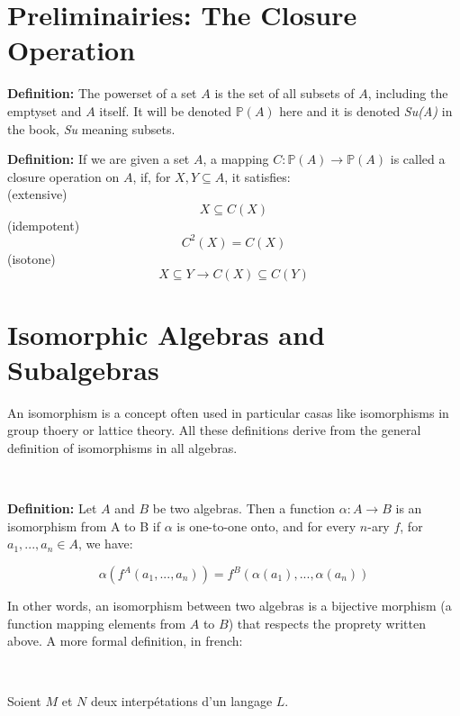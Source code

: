 \documentclass[a4paper, 11pt]{article}
\begin{document}
\section{Preliminairies: The Closure Operation}

\begin{tcolorbox} 
	\textbf{Definition:} The powerset of a set $A$ is the set of all subsets of $A$, including the emptyset and $A$ itself. It will be denoted $\mathbb{P}(A)$ here and it is denoted \textit{Su(A)} in the book, \textit{Su} meaning subsets.

\end{tcolorbox}

\begin{tcolorbox} 
	\textbf{Definition:} If we are given a set $A$, a mapping $C: \mathbb{P}(A) \rightarrow \mathbb{P}(A)$ is called a closure operation on $A$, if, for $X,Y \subseteq A$, it satisfies: \\
	(extensive)$$ X \subseteq C(X)$$
	(idempotent) $$ C^2(X) = C(X)$$
	(isotone) $$X \subseteq Y \rightarrow C(X) \subseteq C(Y)$$ 

\end{tcolorbox}

\section{Isomorphic Algebras and Subalgebras}

An isomorphism is a concept often used in particular casas like isomorphisms in group thoery or lattice theory. All these definitions derive from the general definition of isomorphisms in all algebras. 

\

\begin{tcolorbox} 
	\textbf{Definition:} Let $A$ and $B$ be two algebras. Then a function $\alpha : A \rightarrow B$ is an isomorphism from A to B if $\alpha$ is one-to-one onto, and for every $n$-ary $f$, for $a_1, ..., a_n \in A$, we have:

	$$\alpha (f^A(a_1, ..., a_n)) = f^B(\alpha (a_1), ..., \alpha (a_n))$$
\end{tcolorbox}

In other words, an isomorphism between two algebras is a bijective morphism (a function mapping elements from $A$ to $B$) that respects the proprety written above. A more formal definition, in french:

\

    Soient $M$ et $N$ deux interpétations d'un langage $L$.
    
\end{document}
